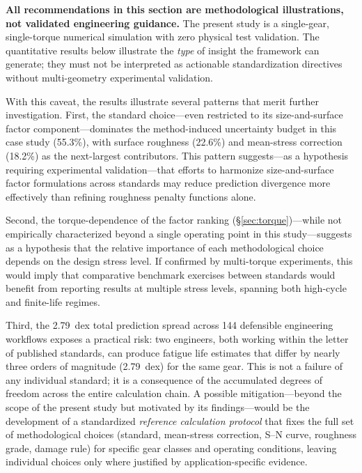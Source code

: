 \documentclass[twocolumn,12pt,a4paper]{article}
\begin{document}
\textbf{All recommendations in this section are methodological
illustrations, not validated engineering guidance.} The present study
is a single-gear, single-torque numerical simulation with zero
physical test validation. The quantitative results below illustrate
the \emph{type} of insight the framework can generate; they must not
be interpreted as actionable standardization directives without
multi-geometry experimental validation.

With this caveat, the results illustrate several patterns that merit
further investigation. First, the standard choice---even restricted to
its size-and-surface factor component---dominates the method-induced uncertainty budget in this case study (55.3\%), with
surface roughness (22.6\%) and mean-stress correction (18.2\%) as the
next-largest contributors. This pattern suggests---as a hypothesis
requiring experimental validation---that efforts to harmonize
size-and-surface factor formulations across standards may reduce
prediction divergence more effectively than refining roughness penalty
functions alone.

Second, the torque-dependence of the factor ranking
(\S\ref{sec:torque})---while not empirically characterized beyond a
single operating point in this study---suggests as a hypothesis that
the relative importance of each methodological choice depends on the
design stress level. If confirmed by multi-torque experiments, this
would imply that comparative benchmark exercises between standards
would benefit from reporting results at multiple stress levels,
spanning both high-cycle and finite-life regimes.

Third, the 2.79~dex total prediction spread across 144 defensible
engineering workflows exposes a practical risk: two engineers, both
working within the letter of published standards, can produce fatigue
life estimates that differ by nearly three orders of magnitude (2.79~dex) for the same
gear. This is not a failure of any individual standard; it is a
consequence of the accumulated degrees of freedom across the entire
calculation chain. A possible mitigation---beyond the scope of the
present study but motivated by its findings---would be the development
of a standardized \emph{reference calculation protocol} that fixes the
full set of methodological choices (standard, mean-stress correction,
S--N curve, roughness grade, damage rule) for specific gear classes and
operating conditions, leaving individual choices only where justified
by application-specific evidence.
\end{document}
